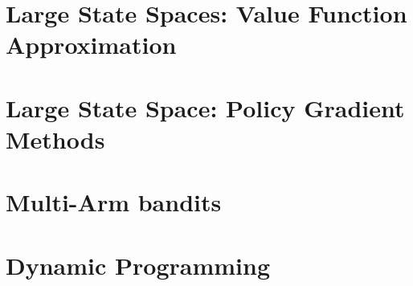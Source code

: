 \documentclass[12pt]{book}
\begin{document}
\chapter{Large State Spaces: Value Function Approximation}
\label{chapter:function-approximation}


\chapter{Large State Space: Policy Gradient Methods}
\label{chapter:policy-gradient}


\chapter{ Multi-Arm bandits}
\label{chapter:MAB}




% 

% 

% 

% 

\appendix

\chapter{Dynamic Programming}
\label{chapter:dp}




\end{document}
